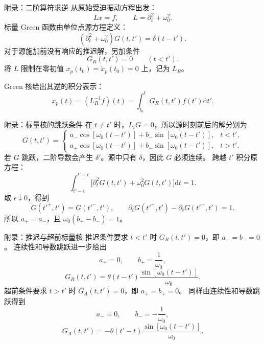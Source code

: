 \documentclass[aspectratio=169,11pt]{beamer}
\newcommand{\dd}{\mathrm d}
\begin{document}
\renewcommand{\appendixname}{附录}
\appendix

\begin{frame}{附录：二阶算符求逆}
从原始受迫振动方程出发：
\[
Lx=f,\qquad L=\partial_t^2+\omega_0^2.
\]
标量 Green 函数由单位点源方程定义：
\[
(\partial_t^2+\omega_0^2)G(t,t')=\delta(t-t').
\]
对于源施加前没有响应的推迟解，另加条件
\[
G_R(t,t')=0\qquad(t<t').
\]
将 $L$ 限制在零初值 $x_p(t_0)=\dot x_p(t_0)=0$ 上，记为 $L_R$。
\par
Green 核给出其逆的积分表示：
\[
x_p(t)=(L_R^{-1}f)(t)
=\int_{t_0}^{t}G_R(t,t')f(t')\dd t'.
\]
\end{frame}

\begin{frame}{附录：标量核的跳跃条件}
在 $t\ne t'$ 时，$L_tG=0$，所以源时刻前后的解分别为
\[
G(t,t')=\begin{cases}
a_-\cos[\omega_0(t-t')]+b_-\sin[\omega_0(t-t')],&t<t',\\
a_+\cos[\omega_0(t-t')]+b_+\sin[\omega_0(t-t')],&t>t'.
\end{cases}
\]
若 $G$ 跳跃，二阶导数会产生 $\delta'$。源中只有 $\delta$，因此 $G$ 必须连续。
跨越 $t'$ 积分原方程：
\[
\int_{t'-\epsilon}^{t'+\epsilon}
\bigl[\partial_t^2G(t,t')+\omega_0^2G(t,t')\bigr]\dd t=1.
\]
取 $\epsilon\downarrow0$，得到
\[
G(t'^+,t')=G(t'^-,t'),\qquad
\partial_tG(t'^+,t')-\partial_tG(t'^-,t')=1.
\]
所以 $a_+=a_-$，且 $\omega_0(b_+-b_-)=1$。
\end{frame}

\begin{frame}{附录：推迟与超前标量核}
推迟条件要求 $t<t'$ 时 $G_R(t,t')=0$，即 $a_-=b_-=0$。
连续性和导数跳跃进一步给出
\[
a_+=0,\qquad b_+=\frac{1}{\omega_0},
\]
\[
\boxed{G_R(t,t')=\theta(t-t')\frac{\sin[\omega_0(t-t')]}{\omega_0}}.
\]
超前条件要求 $t>t'$ 时 $G_A(t,t')=0$，即 $a_+=b_+=0$。
同样由连续性和导数跳跃得到
\[
a_-=0,\qquad b_-=-\frac{1}{\omega_0},
\]
\[
\boxed{G_A(t,t')=-\theta(t'-t)\frac{\sin[\omega_0(t-t')]}{\omega_0}}.
\]
\end{frame}
\end{document}
